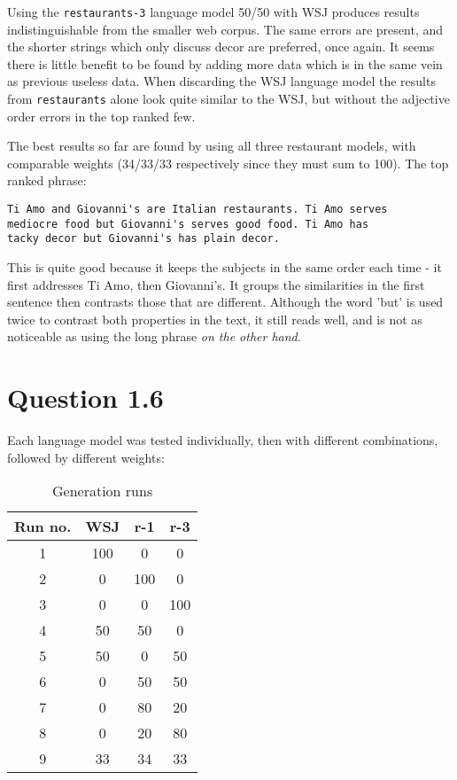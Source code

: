\documentclass[a4paper,11pt,oneside]{article}
\begin{document}
Using the \verb+restaurants-3+ language model 50/50 with WSJ produces results indistinguishable from the smaller web corpus. The same errors are present, and the shorter strings which only discuss decor are preferred, once again. It seems there is little benefit to be found by adding more data which is in the same vein as previous useless data. When discarding the WSJ language model the results from \verb+restaurants+ alone look quite similar to the WSJ, but without the adjective order errors in the top ranked few.

The best results so far are found by using all three restaurant models, with comparable weights (34/33/33 respectively since they must sum to 100). The top ranked phrase:

\begin{verbatim}
Ti Amo and Giovanni's are Italian restaurants. Ti Amo serves 
mediocre food but Giovanni's serves good food. Ti Amo has 
tacky decor but Giovanni's has plain decor. 
\end{verbatim}

This is quite good because it keeps the subjects in the same order each time - it first addresses Ti Amo, then Giovanni's. It groups the similarities in the first sentence then contrasts those that are different. Although the word 'but' is used twice to contrast both properties in the text, it still reads well, and is not as noticeable as using the long phrase \emph{on the other hand}.

\section{Question 1.6}

Each language model was tested individually, then with different combinations, followed by different weights:

\begin{table}[h]
    \caption{Generation runs}
    \centering 
    \begin{tabular}{ | c | c | c | c | }
        \hline                        
        Run no. & WSJ & r-1 & r-3 \\ \hline
        1 & 100 & 0 & 0 \\
        2 & 0 & 100 & 0 \\
        3 & 0 & 0 & 100 \\
        4 & 50 & 50 & 0 \\
        5 & 50 & 0 & 50 \\
        6 & 0 & 50 & 50 \\
        7 & 0 & 80 & 20 \\
        8 & 0 & 20 & 80 \\
        9 & 33 & 34 & 33 \\
        \hline  
    \end{tabular}
\end{table}
\end{document}
